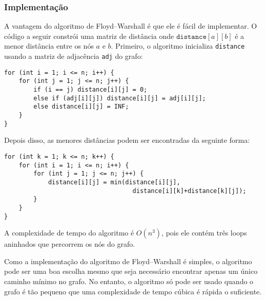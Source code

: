 \subsubsection{Implementação}

A vantagem do
algoritmo de Floyd–Warshall é que ele é
fácil de implementar.
O código a seguir constrói uma
matriz de distância onde $\texttt{distance}[a][b]$
é a menor distância entre os nós $a$ e $b$.
Primeiro, o algoritmo inicializa \texttt{distance}
usando a matriz de adjacência \texttt{adj} do grafo:

\begin{lstlisting}
for (int i = 1; i <= n; i++) {
    for (int j = 1; j <= n; j++) {
        if (i == j) distance[i][j] = 0;
        else if (adj[i][j]) distance[i][j] = adj[i][j];
        else distance[i][j] = INF;
    }
}
\end{lstlisting}
Depois disso, as menores distâncias podem ser encontradas da seguinte forma:
\begin{lstlisting}
for (int k = 1; k <= n; k++) {
    for (int i = 1; i <= n; i++) {
        for (int j = 1; j <= n; j++) {
            distance[i][j] = min(distance[i][j],
                                   distance[i][k]+distance[k][j]);
        }
    }
}
\end{lstlisting}

A complexidade de tempo do algoritmo é $O(n^3)$,
pois ele contém três loops aninhados
que percorrem os nós do grafo.

Como a implementação do algoritmo de Floyd–Warshall
é simples, o algoritmo pode ser
uma boa escolha mesmo que seja necessário encontrar apenas um
único caminho mínimo no grafo.
No entanto, o algoritmo só pode ser usado quando o grafo
é tão pequeno que uma complexidade de tempo cúbica é rápida o suficiente.
